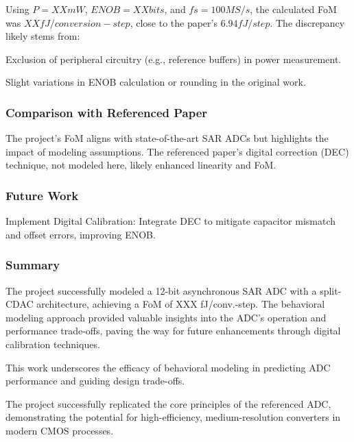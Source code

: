 Using $P= XX mW$, $ENOB=XX bits$, and $fs=100MS/s$, the calculated FoM was $XX fJ/conversion-step$, close to the paper's $6.94 fJ/step$. The discrepancy likely stems from:

    Exclusion of peripheral circuitry (e.g., reference buffers) in power measurement.

    Slight variations in ENOB calculation or rounding in the original work.

\subsubsection{Comparison with Referenced Paper}

    The project's FoM aligns with state-of-the-art SAR ADCs but highlights the impact of modeling assumptions. The referenced paper's digital correction (DEC) technique, not modeled here, likely enhanced linearity and FoM.

\subsubsection{Future Work}

Implement Digital Calibration: Integrate DEC to mitigate capacitor mismatch and offset errors, improving ENOB.

\subsubsection{Summary}
The project successfully modeled a 12-bit asynchronous SAR ADC with a split-CDAC architecture, achieving a FoM of XXX fJ/conv.-step. The behavioral modeling approach provided valuable insights into the ADC's operation and performance trade-offs, paving the way for future enhancements through digital calibration techniques.

This work underscores the efficacy of behavioral modeling in predicting ADC performance and guiding design trade-offs. 

The project successfully replicated the core principles of the referenced ADC, demonstrating the potential for high-efficiency, medium-resolution converters in modern CMOS processes. 